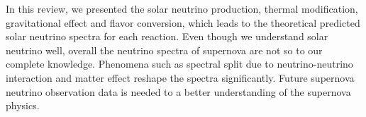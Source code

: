 \documentclass[%
 aip,
 jmp,%
 amsmath,amssymb,
 reprint,%
]{revtex4-1}
\begin{document}
In this review, we presented the solar neutrino production, thermal modification, gravitational effect and flavor conversion, which leads to the theoretical predicted solar neutrino spectra for each reaction. Even though we understand solar neutrino well, overall the neutrino spectra of supernova are not so to our complete knowledge. Phenomena such as spectral split due to neutrino-neutrino interaction and matter effect reshape the spectra significantly. Future supernova neutrino observation data is needed to a better understanding of the supernova physics.






\medskip

%

\end{document}
